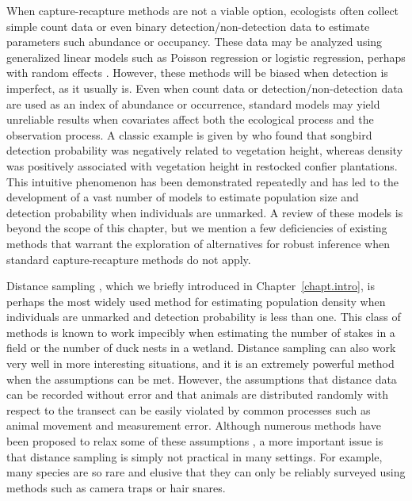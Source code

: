 When capture-recapture methods are not a viable option, ecologists
often collect simple count data or even binary detection/non-detection data
to estimate parameters such abundance or occupancy.
These
data may be analyzed using generalized linear models such as
Poisson regression or logistic regression, perhaps with random
effects \citep{zuur_etal:2009}. %
However, these methods will be biased when detection is imperfect, as
it usually is. Even when count data or detection/non-detection data are
used as an index of abundance or occurrence, standard models may yield
unreliable results when covariates affect both the ecological process
and the observation process. A classic example is given by
\citet{bibby_buckland:1987} who found that songbird detection
probability was negatively related to vegetation height, whereas
density was positively associated with vegetation height in restocked
confier plantations. This intuitive phenomenon has been
demonstrated repeatedly \citep[e.g.][]{kery:2008,sillett_etal:2012} and has led to the
development of a vast number of models to estimate population size and
detection probability when individuals are unmarked. A review of these
models is beyond the scope of this
chapter, but we mention a few deficiencies of existing methods
that warrant the exploration of alternatives for robust inference when
standard capture-recapture methods do not apply.

Distance sampling \citep{buckland_etal:2001}, which we briefly
introduced in Chapter~\ref{chapt.intro},
is perhaps the most widely used method for
estimating population density when individuals are unmarked and
detection probability is less than one. This class of methods is known
to work impecibly when estimating the number of stakes in a field or
the number of duck nests in a wetland. Distance sampling can also work very well in
more interesting situations, and it is an extremely powerful method when
the assumptions can be met. However, the assumptions that distance
data can be recorded without error and that animals are distributed
randomly with respect to the transect can be easily violated by
common processes such as animal movement and measurement
error. Although numerous methods have been proposed to
relax some of these assumptions
\citet{royle_etal:2004, borchers_etal:1998, johnson_etal:2010,
  chandler_etal:2011},
a more important issue is that distance
sampling is simply not practical in many settings. For example, many
species are so rare and elusive that they can only be reliably
surveyed using methods such as camera traps or hair snares. %

